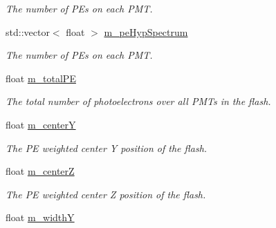 \begin{DoxyCompactItemize}
\begin{DoxyCompactList}\small\item\em The number of P\+Es on each P\+MT. \end{DoxyCompactList}\item 
std\+::vector$<$ float $>$ \hyperlink{classflashmatch_1_1FlashMatchingTool_1_1FlashCandidate_a3ecf14f425f49452494ece572ef97927}{m\+\_\+pe\+Hyp\+Spectrum}\hypertarget{classflashmatch_1_1FlashMatchingTool_1_1FlashCandidate_a3ecf14f425f49452494ece572ef97927}{}\label{classflashmatch_1_1FlashMatchingTool_1_1FlashCandidate_a3ecf14f425f49452494ece572ef97927}

\begin{DoxyCompactList}\small\item\em The number of P\+Es on each P\+MT. \end{DoxyCompactList}\item 
float \hyperlink{classflashmatch_1_1FlashMatchingTool_1_1FlashCandidate_a5193b7f6862ca08d3dd91a16f2ade309}{m\+\_\+total\+PE}\hypertarget{classflashmatch_1_1FlashMatchingTool_1_1FlashCandidate_a5193b7f6862ca08d3dd91a16f2ade309}{}\label{classflashmatch_1_1FlashMatchingTool_1_1FlashCandidate_a5193b7f6862ca08d3dd91a16f2ade309}

\begin{DoxyCompactList}\small\item\em The total number of photoelectrons over all P\+M\+Ts in the flash. \end{DoxyCompactList}\item 
float \hyperlink{classflashmatch_1_1FlashMatchingTool_1_1FlashCandidate_ac75a41fb6afaab35cee4510d76bf6405}{m\+\_\+centerY}\hypertarget{classflashmatch_1_1FlashMatchingTool_1_1FlashCandidate_ac75a41fb6afaab35cee4510d76bf6405}{}\label{classflashmatch_1_1FlashMatchingTool_1_1FlashCandidate_ac75a41fb6afaab35cee4510d76bf6405}

\begin{DoxyCompactList}\small\item\em The PE weighted center Y position of the flash. \end{DoxyCompactList}\item 
float \hyperlink{classflashmatch_1_1FlashMatchingTool_1_1FlashCandidate_afdc868f23ccd16c5528548163d7ec2a7}{m\+\_\+centerZ}\hypertarget{classflashmatch_1_1FlashMatchingTool_1_1FlashCandidate_afdc868f23ccd16c5528548163d7ec2a7}{}\label{classflashmatch_1_1FlashMatchingTool_1_1FlashCandidate_afdc868f23ccd16c5528548163d7ec2a7}

\begin{DoxyCompactList}\small\item\em The PE weighted center Z position of the flash. \end{DoxyCompactList}\item 
float \hyperlink{classflashmatch_1_1FlashMatchingTool_1_1FlashCandidate_a80fccdaaa6a851437fe16e9c4e855ea3}{m\+\_\+widthY}\hypertarget{classflashmatch_1_1FlashMatchingTool_1_1FlashCandidate_a80fccdaaa6a851437fe16e9c4e855ea3}{}\label{classflashmatch_1_1FlashMatchingTool_1_1FlashCandidate_a80fccdaaa6a851437fe16e9c4e855ea3}


\end{DoxyCompactItemize}
